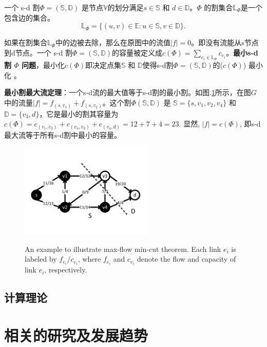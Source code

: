 一个 s-d 割${\Phi}=(\mathbb{S},\mathbb{D})$ 是节点$\mathbb{V}$的划分满足$s \in \mathbb{S}$ 和 $d \in \mathbb{D}$。$\Phi$ 的割集合$\mathbb{\mathbb{L}}_{\Phi}$是一个包含边的集合。
\begin{equation}
\mathbb{\mathbb{L}}_{\Phi}=\{(u,v)\in \mathbb{E}: u \in \mathbb{S}, v \in \mathbb{D}\}.
\end{equation}

如果在割集合$\mathbb{\mathbb{L}}_{\Phi}$中的边被去除，那么在原图中的流值$|f| = 0$。即没有流能从s节点到d节点。一个 s-d 割${\Phi}=(\mathbb{S},\mathbb{D})$的容量被定义成$c(\Phi)=\sum\limits_{e_i\in \mathbb{\mathbb{L}}_{\Phi}}c_{e_i}$。\textbf{最小s-d 割 $\Phi$ 问题}，最小化$c(\Phi)$即决定点集$\mathbb{S}$ 和 $\mathbb{D}$使得s-d割${\Phi}=(\mathbb{S},\mathbb{D})$的($c(\Phi)$) 最小化 。

\textbf{最小割最大流定理}：一个s-d流的最大值等于s-d割的最小割。如图.\ref{fig:FlowNetwork}所示，在图$G$中的流量$|f|=f_{(s,v_1)}+f_{(s,v_2)}$。这个割$\Phi(\mathbb{S},\mathbb{D})$ 是 $\mathbb{S}=\{s,v_1,v_2,v_4\}$ 和$\mathbb{D}=\{v_3,d\}$，它是最小的割其容量为$c(\Phi)=c_{(v_1,v_3)}+c_{(v_4,v_3)}+c_{(v_4,d)}=12+7+4=23$. 显然, $|f|=c(\Phi)$, 即s-d 最大流等于所有s-d割中最小的容量。
\begin{figure}[htbp]
  \centering
  \includegraphics[width=2.5in]{figures/FlowNetwork}\\
  \caption{An example to illustrate max-flow min-cut theorem. Each link $e_i$ is labeled by $f_{e_i}/c_{e_i}$, where $f_{e_i}$ and $c_{e_i}$ denote the flow and capacity of link $e_i$, respectively.   }
  \label{fig:FlowNetwork}
\end{figure}

\subsection{计算理论}

\section{相关的研究及发展趋势}
